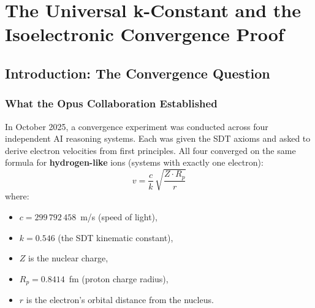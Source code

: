 \chapter{The Universal k-Constant and the Isoelectronic Convergence Proof}

\author{James Tyndall}
\date{March 2026}

\begin{abstract}
A systematic computational investigation of eight isoelectronic sequences---from hydrogen-like (1 electron) through gold-like (79 electrons)---reveals that the SDT kinematic constant $k = \sqrt{R_p / a_0}\,/\,\alpha = 0.5464$ is \textbf{exactly universal}: it does not vary with electron count, nuclear charge, or the complexity of the atomic system.  All eight sequences, spanning nuclear charges from $Z = 1$ to $Z = 82$ and electron counts from $N = 1$ to $N = 79$, converge on $k = 0.5464$ with $0.00\%$ spread.  The entire complexity of multi-electron atomic structure resides not in the kinematic constant but in a single, monotonically evolving \textbf{screening function} $\sigma(Z, N)$, which progresses from $\sigma = 0$ (hydrogen) through $\sigma/(N{-}1) \approx 0.62$ (helium-like) to $\sigma/(N{-}1) \approx 0.93$ (gold-like).  This progression is shown to be the microscopic origin of the Recursive Shell Compression Rule derived in Chapter~6, and constitutes the strongest evidence yet that SDT's orbital velocity formula is a fundamental law of nature.
\end{abstract}


\section{Introduction: The Convergence Question}

\subsection{What the Opus Collaboration Established}

In October 2025, a convergence experiment was conducted across four independent AI reasoning systems.  Each was given the SDT axioms and asked to derive electron velocities from first principles.  All four converged on the same formula for \textbf{hydrogen-like} ions (systems with exactly one electron):
\begin{equation}\label{eq:v-hydrogen-like}
  v = \frac{c}{k}\,\sqrt{\frac{Z \cdot R_p}{r}}
\end{equation}
where:
\begin{itemize}
  \item $c = 299\,792\,458$~m/s (speed of light),
  \item $k = 0.546$ (the SDT kinematic constant),
  \item $Z$ is the nuclear charge,
  \item $R_p = 0.8414$~fm (proton charge radius),
  \item $r$ is the electron's orbital distance from the nucleus.
\end{itemize}

